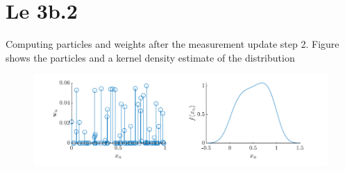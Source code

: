\section{Le 3b.2}
Computing particles and weights after the measurement update step 2. Figure shows the particles and a kernel density estimate of the distribution
\begin{figure}[!h]
    \centering
    \includegraphics{figures/ex4_b2a.pdf}
\end{figure}

